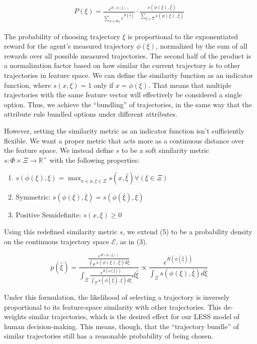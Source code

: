 \documentclass[
  letterpaper,
  numbers=noenddot,
  DIV=11]{scrreprt}
\theoremstyle{definition}
\theoremstyle{plain}
\theoremstyle{plain}
\theoremstyle{remark}
\begin{document}
\[\begin{aligned}
    P(\xi) = \frac{e^{R(\phi(\xi))}}{\sum_{\bar{\phi} \in \Phi_{\Xi}} e^{R(\hat{\phi})}} \cdot \frac{s(\phi(\xi), \bar{\xi})}{\sum_{\hat{\xi} \in \Xi} s(\phi(\xi), \bar{\xi})}
\end{aligned}\]

The probability of choosing trajectory \(\xi\) is proportional to the
exponentiated reward for the agent's measured trajectory \(\phi(\xi)\),
normalized by the sum of all rewards over all possible measured
trajectories. The second half of the product is a normalization factor
based on how similar the current trajectory is to other trajectories in
feature space. We can define the similarity function as an indicator
function, where \(s(x, \xi) = 1\) only if \(x = \phi(\xi)\). That means
that multiple trajectories with the same feature vector will effectively
be considered a single option. Thus, we achieve the ``bundling'' of
trajectories, in the same way that the attribute rule bundled options
under different attributes.

However, setting the similarity metric as an indicator function isn't
sufficiently flexible. We want a proper metric that acts more as a
continuous distance over the feature space. We instead define \(s\) to
be a soft similarity metric
\(s : \Phi \times \Xi \rightarrow \mathbb{R}^+\) with the following
properties:

\begin{enumerate}
\def\labelenumi{\arabic{enumi}.}
\item
  \(s(\phi(\xi), \xi) = \max_{x \in \phi, \bar{\xi} \in \Xi} s(x, \hat{\xi}) \forall (\xi \in \Xi)\)
\item
  Symmetric: \(s(\phi(\xi), \bar{\xi}) = s(\phi(\bar{\xi}), \xi)\)
\item
  Positive Semidefinite: \(s(x, \xi) \geq 0\)
\end{enumerate}

Using this redefined similarity metric \(s\), we extend (5) to be a
probability density on the continuous trajectory space \(\mathcal{E}\),
as in (3).

\[p(\hat{\xi}) = \frac{\frac{e^{R(\phi(\xi))}}{\int_{\Xi} s(\phi(\xi), \bar{\xi}) d\bar{\xi}}}{\int_{\Xi}\frac{e^{R(\phi(\hat{\xi}))}}{\int_{\Xi} s(\phi(\hat{\xi}), \bar{\xi}) d\bar{\xi}}d\hat{\xi}} \propto \frac{e^{R(\phi(\hat{\xi}))}}{\int_{\Xi} s(\phi(\xi), \bar{\xi}) d\bar{\xi}}\]

Under this formulation, the likelihood of selecting a trajectory is
inversely proportional to its feature-space similarity with other
trajectories. This de-weights similar trajectories, which is the desired
effect for our LESS model of human decision-making. This means, though,
that the ``trajectory bundle'' of similar trajectories still has a
reasonable probability of being chosen.
\end{document}
